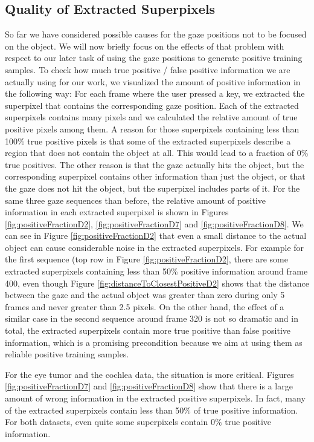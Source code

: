\subsection{Quality of Extracted Superpixels}
So far we have considered possible causes for the gaze positions not to be focused on the object. 
We will now briefly focus on the effects of that problem with respect to our later task of using the gaze positions to generate positive training samples. 
To check how much true positive / false positive information we are actually using for our work, we visualized the amount of positive information in the following way: 
For each frame where the user pressed a key, we extracted the superpixel that contains the corresponding gaze position. 
Each of the extracted superpixels contains many pixels and we calculated the relative amount of true positive pixels among them. 
A reason for those superpixels containing less than 100\% true positive pixels is that some of the extracted superpixels describe a region that does not contain the object at all. 
This would lead to a fraction of 0\% true positives. 
The other reason is that the gaze actually hits the object, but the corresponding superpixel contains other information than just the object, or that the gaze does not hit the object, but the superpixel includes parts of it. 
For the same three gaze sequences than before, the relative amount of positive information in each extracted superpixel is shown in Figures \ref{fig:positiveFractionD2}, \ref{fig:positiveFractionD7} and \ref{fig:positiveFractionD8}. 
We can see in Figure \ref{fig:positiveFractionD2} that even a small distance to the actual object can cause considerable noise in the extracted superpixels. 
For example for the first sequence (top row in Figure \ref{fig:positiveFractionD2}, there are some extracted superpixels containing less than 50\% positive information around frame 400, even though Figure \ref{fig:distanceToClosestPositiveD2} shows that the distance between the gaze and the actual object was greater than zero during only 5 frames and never greater than 2.5 pixels. On the other hand, the effect of a similar case in the second sequence around frame 320 is not so dramatic and in total, the extracted superpixels contain more true positive than false positive information, which is a promising precondition because we aim at using them as reliable positive training samples. 

For the eye tumor and the cochlea data, the situation is more critical. Figures \ref{fig:positiveFractionD7} and \ref{fig:positiveFractionD8} show that there is a large amount of wrong information in the extracted positive superpixels. In fact, many of the extracted superpixels contain less than 50\% of true positive information. For both datasets, even quite some superpixels contain $0\%$ true positive information.

